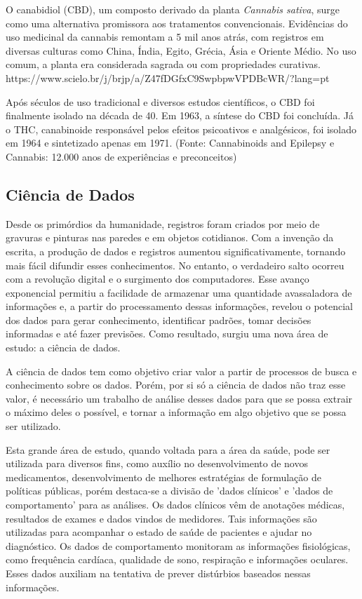 \documentclass[article,a4paper,12pt,brazil,sumario=tradicional]{abntex2}
\begin{document}
O canabidiol (CBD), um composto derivado da planta \textit{Cannabis sativa}, surge como uma alternativa promissora aos tratamentos convencionais. Evidências do uso medicinal da cannabis remontam a 5 mil anos atrás, com registros em diversas culturas como China, Índia, Egito, Grécia, Ásia e Oriente Médio. No uso comum, a planta era considerada sagrada ou com propriedades curativas.
https://www.scielo.br/j/brjp/a/Z47fDGfxC9SwpbpwVPDBcWR/?lang=pt

Após séculos de uso tradicional e diversos estudos científicos, o CBD foi finalmente isolado na década de 40. Em 1963, a síntese do CBD foi concluída. Já o THC, canabinoide responsável pelos efeitos psicoativos e analgésicos, foi isolado em 1964 e sintetizado apenas em 1971. (Fonte: Cannabinoids and Epilepsy e Cannabis: 12.000 anos de experiências e preconceitos)

\subsection{Ciência de Dados}

Desde os primórdios da humanidade, registros foram criados por meio de gravuras e pinturas nas paredes e em objetos cotidianos. Com a invenção da escrita, a produção de dados e registros aumentou significativamente, tornando mais fácil difundir esses conhecimentos. No entanto, o verdadeiro salto ocorreu com a revolução digital e o surgimento dos computadores. Esse avanço exponencial permitiu a facilidade de armazenar uma quantidade avassaladora de informações e, a partir do processamento dessas informações, revelou o potencial dos dados para gerar conhecimento, identificar padrões, tomar decisões informadas e até fazer previsões. Como resultado, surgiu uma nova área de estudo: a ciência de dados.

A ciência de dados tem como objetivo criar valor a partir de processos de busca e conhecimento sobre os dados. Porém, por si só a ciência de dados não traz esse valor, é necessário um trabalho de análise desses dados para que se possa extrair o máximo deles o possível, e tornar a informação em algo objetivo que se possa ser utilizado.

Esta grande área de estudo, quando voltada para a área da saúde, pode ser utilizada para diversos fins, como auxílio no desenvolvimento de novos medicamentos, desenvolvimento de melhores estratégias de formulação de políticas públicas, porém destaca-se a divisão de 'dados clínicos' e 'dados de comportamento' para as análises. Os dados clínicos vêm de anotações médicas, resultados de exames e dados vindos de medidores. Tais informações são utilizadas para acompanhar o estado de saúde de pacientes e ajudar no diagnóstico. Os dados de comportamento monitoram as informações fisiológicas, como frequência cardíaca, qualidade de sono, respiração e informações oculares. Esses dados auxiliam na tentativa de prever distúrbios baseados nessas informações.
\end{document}
